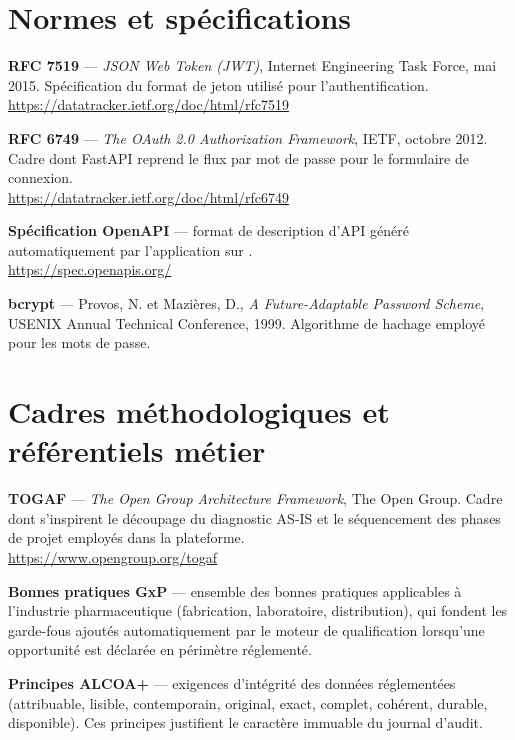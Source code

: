 \section*{Normes et spécifications}

\begin{enumerate}[label={[\arabic*]}, leftmargin=*, itemsep=5pt, start=14]
  \item \textbf{RFC 7519} — \emph{JSON Web Token (JWT)}, Internet Engineering Task
    Force, mai 2015. Spécification du format de jeton utilisé pour
    l'authentification.\\
    \url{https://datatracker.ietf.org/doc/html/rfc7519}

  \item \textbf{RFC 6749} — \emph{The OAuth 2.0 Authorization Framework}, IETF, octobre
    2012. Cadre dont FastAPI reprend le flux par mot de passe pour le formulaire de
    connexion.\\
    \url{https://datatracker.ietf.org/doc/html/rfc6749}

  \item \textbf{Spécification OpenAPI} — format de description d'API généré
    automatiquement par l'application sur .\\
    \url{https://spec.openapis.org/}

  \item \textbf{bcrypt} — Provos, N. et Mazières, D., \emph{A Future-Adaptable Password
    Scheme}, USENIX Annual Technical Conference, 1999. Algorithme de hachage employé
    pour les mots de passe.
\end{enumerate}

\section*{Cadres méthodologiques et référentiels métier}

\begin{enumerate}[label={[\arabic*]}, leftmargin=*, itemsep=5pt, start=18]
  \item \textbf{TOGAF} — \emph{The Open Group Architecture Framework}, The Open Group.
    Cadre dont s'inspirent le découpage du diagnostic AS-IS et le séquencement des
    phases de projet employés dans la plateforme.\\
    \url{https://www.opengroup.org/togaf}

  \item \textbf{Bonnes pratiques GxP} — ensemble des bonnes pratiques applicables à
    l'industrie pharmaceutique (fabrication, laboratoire, distribution), qui fondent
    les garde-fous ajoutés automatiquement par le moteur de qualification lorsqu'une
    opportunité est déclarée en périmètre réglementé.

  \item \textbf{Principes ALCOA+} — exigences d'intégrité des données réglementées
    (attribuable, lisible, contemporain, original, exact, complet, cohérent, durable,
    disponible). Ces principes justifient le caractère immuable du journal d'audit.
\end{enumerate}


